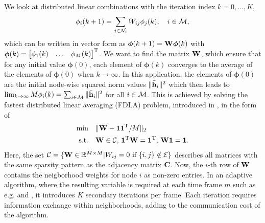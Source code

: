 \documentclass{article}
\begin{document}
We look at distributed linear combinations with the iteration index \(k=0,...,K\),
\begin{equation}
    \phi_i({k+1}) = \sum_{j \in \mathcal{N}_i} W_{ij} \phi_j({k}),\quad i\in \mathcal{M},\label{eq:adaptivenormest:distlincomb}
\end{equation}
which can be written in vector form as \(\bm{\phi}({k+1}) = \bm{\mathrm{W}} \bm{\phi}({k})\) with \(\bm{\phi}(k) = \begin{bmatrix} \phi_1(k) & \ldots & \phi_M(k) \end{bmatrix}^{\mathrm{T}}\).
We want to find the matrix \(\bm{\mathrm{W}}\), which ensure that for any initial value \(\bm{\phi}({0})\), each element of \(\bm{\phi}({k})\) converges to the average of the elements of \(\bm{\phi}({0})\) when \(k \to \infty\).
In this application, the elements of \(\bm{\phi}(0)\) are the initial node-wise squared norm values \(\|\bar{\bm{\mathrm{h}}}_i\|^2\) which then leads to \(\lim_{k \to \infty} M \phi_i(k) = \sum_{i \in \mathcal{M}} \|\bar{\bm{\mathrm{h}}}_i\|^2\) for all \(i \in \mathcal{M}\).
This is achieved by solving the fastest distributed linear averaging (FDLA) problem, introduced in \cite{xiaoFastLinearIterations2004}, in the form of
\begin{equation}
    \begin{aligned}
        \min& \quad \| \bm{\mathrm{W}} - \bm{1}\bm{1}^{\mathrm{T}}/M\|_2\\
        \text{s.t.}& \quad \bm{\mathrm{W}} \in \mathcal{C},\, \bm{1}^{\mathrm{T}} \bm{\mathrm{W}} = \bm{1}^{\mathrm{T}},\, \bm{\mathrm{W}} \bm{1}= \bm{1}.
    \end{aligned}\label{eq:adaptivenormest:fdlaminprob}
\end{equation}
Here, the set \(\mathcal{C} = \{\bm{\mathrm{W}} \in \mathbb{R}^{M \times M} \vert W_{ij} = 0 \text{ if } \{i,j\} \notin \mathcal{E}\}\) describes all matrices with the same sparsity pattern as the adjacency matrix \(\bm{\mathrm{C}}\).
Now, the \(i\)-th row of \(\bm{\mathrm{W}}\) contains the neigborhood weights for node \(i\) as non-zero entries.
In an adaptive algorithm, where the resulting variable is required at each time frame \(m\) such as e.g. \cite{yuDistributedBlindSystem2014, liuDistributedBlindIdentification2016} and \cite{blochbergerDBSI}, it introduces \(K\) secondary iterations per frame.
Each iteration requires information exchange within neighborhoods, adding to the communication cost of the algorithm.
\end{document}
